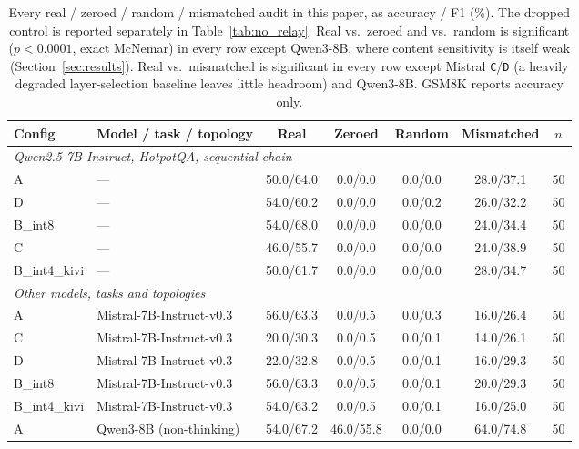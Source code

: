 \begin{table}[t]
\centering
\small
\caption{Every real / zeroed / random / mismatched audit in this paper, as accuracy / F1 (\%). The dropped control is reported separately in Table~\ref{tab:no_relay}. Real vs.\ zeroed and vs.\ random is significant ($p<0.0001$, exact McNemar) in every row except Qwen3-8B, where content sensitivity is itself weak (Section~\ref{sec:results}). Real vs.\ mismatched is significant in every row except Mistral \texttt{C}/\texttt{D} (a heavily degraded layer-selection baseline leaves little headroom) and Qwen3-8B. GSM8K reports accuracy only.}
\label{tab:causal_audit_full}
\begin{tabular}{llccccc}
\toprule
\textbf{Config} & \textbf{Model / task / topology} & \textbf{Real} & \textbf{Zeroed} & \textbf{Random} & \textbf{Mismatched} & \textbf{$n$} \\
\midrule
\multicolumn{7}{l}{\emph{Qwen2.5-7B-Instruct, HotpotQA, sequential chain}} \\
A            & ---                         & 50.0/64.0 & 0.0/0.0  & 0.0/0.0  & 28.0/37.1 & 50 \\
D            & ---                         & 54.0/60.2 & 0.0/0.0  & 0.0/0.2  & 26.0/32.2 & 50 \\
B\_int8      & ---                         & 54.0/68.0 & 0.0/0.0  & 0.0/0.0  & 24.0/34.4 & 50 \\
C            & ---                         & 46.0/55.7 & 0.0/0.0  & 0.0/0.0  & 24.0/38.9 & 50 \\
B\_int4\_kivi& ---                         & 50.0/61.7 & 0.0/0.0  & 0.0/0.0  & 28.0/34.7 & 50 \\
\midrule
\multicolumn{7}{l}{\emph{Other models, tasks and topologies}} \\
A            & Mistral-7B-Instruct-v0.3    & 56.0/63.3 & 0.0/0.5  & 0.0/0.3  & 16.0/26.4 & 50 \\
C            & Mistral-7B-Instruct-v0.3    & 20.0/30.3 & 0.0/0.5  & 0.0/0.1  & 14.0/26.1 & 50 \\
D            & Mistral-7B-Instruct-v0.3    & 22.0/32.8 & 0.0/0.5  & 0.0/0.1  & 16.0/29.3 & 50 \\
B\_int8      & Mistral-7B-Instruct-v0.3    & 56.0/63.3 & 0.0/0.5  & 0.0/0.1  & 20.0/29.3 & 50 \\
B\_int4\_kivi& Mistral-7B-Instruct-v0.3    & 54.0/63.2 & 0.0/0.5  & 0.0/0.1  & 16.0/25.0 & 50 \\
A            & Qwen3-8B (non-thinking)     & 54.0/67.2 & 46.0/55.8& 0.0/0.0  & 64.0/74.8 & 50 \\

\end{tabular}
\end{table}
